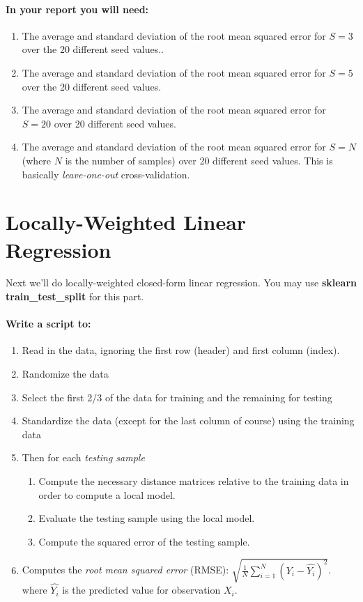 \documentclass[12pt]{article}
\begin{document}
\paragraph{In your report you will need:}
\begin{enumerate}
\item The average and standard deviation of the root mean squared error for $S=3$ over the 20 different seed values..
\item The average and standard deviation of the root mean squared error for $S=5$ over the 20 different seed values.
\item The average and standard deviation of the root mean squared error for $S=20$ over 20 different seed values.
\item The average and standard deviation of the root mean squared error for $S=N$ (where $N$ is the number of samples) over 20 different seed values.  This is basically \emph{leave-one-out} cross-validation.
\end{enumerate}


\newpage
\section{Locally-Weighted Linear Regression}
\noindent
Next we'll do locally-weighted closed-form linear regression.  You may use \textbf{sklearn train\_test\_split} for this part.\\

\paragraph{Write a script to:}
\begin{enumerate}
  \item Read in the data, ignoring the first row (header) and first column (index).
  \item Randomize the data
  \item Select the first 2/3 of the data for training and the remaining for testing
  \item Standardize the data (except for the last column of course) using the training data
  \item Then for each \emph{testing sample}
  	\begin{enumerate}
  	\item Compute the necessary distance matrices relative to the training data in order to compute a local model.
  	\item Evaluate the testing sample using the local model.
  	\item Compute the squared error of the testing sample.
  	\end{enumerate}
 \item Computes the \emph{root mean squared error} (RMSE): $\sqrt{\frac{1}{N}\sum_{i=1}^N (Y_i-\hat{Y_i})^2}$. where $\hat{Y_i}$ is the predicted value for observation $X_i$.
\end{enumerate}
\end{document}
